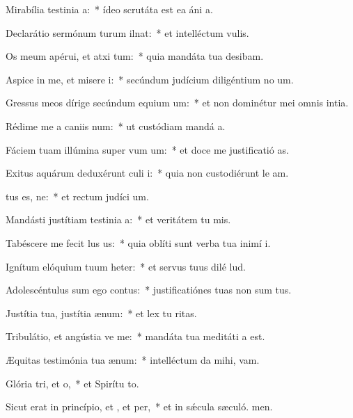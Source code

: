 \item Mirabília testinia a:~* ídeo scrutáta est ea áni a.
\item Declarátio sermónum turum ilnat:~* et intelléctum  vulis.
\item Os meum apérui, et atxi tum:~* quia mandáta tua desibam.
\item Aspice in me, et misere i:~* secúndum judícium diligéntium no um.
\item Gressus meos dírige secúndum equium um:~* et non dominétur mei omnis intia.
\item Rédime me a caniis num:~* ut custódiam mandá a.
\item Fáciem tuam illúmina super vum um:~* et doce me justificatió as.
\item Exitus aquárum deduxérunt culi i:~* quia non custodiérunt le am.
\item {}tus es, ne:~* et rectum judíci um.
\item Mandásti justítiam testinia a:~* et veritátem tu mis.
\item Tabéscere me fecit lus us:~* quia oblíti sunt verba tua inimí i.
\item Ignítum elóquium tuum heter:~* et servus tuus dilé lud.
\item Adolescéntulus sum ego  contus:~* justificatiónes tuas non sum tus.
\item Justítia tua, justítia  ænum:~* et lex tu ritas.
\item Tribulátio, et angústia ve me:~* mandáta tua meditáti a est.
\item Æquitas testimónia tua  ænum:~* intelléctum da mihi,  vam.
\item Glória tri, et o,~* et Spirítu to.
\item Sicut erat in princípio, et , et per,~* et in sǽcula sæculó. men.
